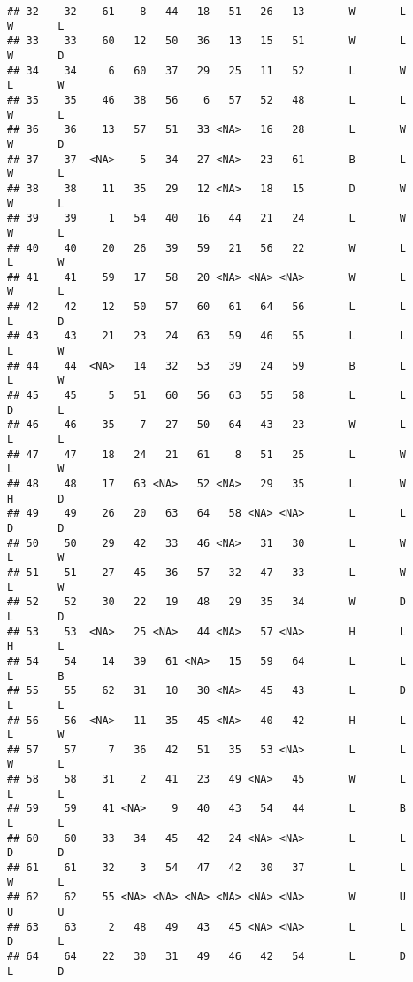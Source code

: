 \documentclass[
]{article}
\begin{document}
\begin{verbatim}
## 32    32    61    8   44   18   51   26   13       W       L       W       L
## 33    33    60   12   50   36   13   15   51       W       L       W       D
## 34    34     6   60   37   29   25   11   52       L       W       L       W
## 35    35    46   38   56    6   57   52   48       L       L       W       L
## 36    36    13   57   51   33 <NA>   16   28       L       W       W       D
## 37    37  <NA>    5   34   27 <NA>   23   61       B       L       W       L
## 38    38    11   35   29   12 <NA>   18   15       D       W       W       L
## 39    39     1   54   40   16   44   21   24       L       W       W       L
## 40    40    20   26   39   59   21   56   22       W       L       L       W
## 41    41    59   17   58   20 <NA> <NA> <NA>       W       L       W       L
## 42    42    12   50   57   60   61   64   56       L       L       L       D
## 43    43    21   23   24   63   59   46   55       L       L       L       W
## 44    44  <NA>   14   32   53   39   24   59       B       L       L       W
## 45    45     5   51   60   56   63   55   58       L       L       D       L
## 46    46    35    7   27   50   64   43   23       W       L       L       L
## 47    47    18   24   21   61    8   51   25       L       W       L       W
## 48    48    17   63 <NA>   52 <NA>   29   35       L       W       H       D
## 49    49    26   20   63   64   58 <NA> <NA>       L       L       D       D
## 50    50    29   42   33   46 <NA>   31   30       L       W       L       W
## 51    51    27   45   36   57   32   47   33       L       W       L       W
## 52    52    30   22   19   48   29   35   34       W       D       L       D
## 53    53  <NA>   25 <NA>   44 <NA>   57 <NA>       H       L       H       L
## 54    54    14   39   61 <NA>   15   59   64       L       L       L       B
## 55    55    62   31   10   30 <NA>   45   43       L       D       L       L
## 56    56  <NA>   11   35   45 <NA>   40   42       H       L       L       W
## 57    57     7   36   42   51   35   53 <NA>       L       L       W       L
## 58    58    31    2   41   23   49 <NA>   45       W       L       L       L
## 59    59    41 <NA>    9   40   43   54   44       L       B       L       L
## 60    60    33   34   45   42   24 <NA> <NA>       L       L       D       D
## 61    61    32    3   54   47   42   30   37       L       L       W       L
## 62    62    55 <NA> <NA> <NA> <NA> <NA> <NA>       W       U       U       U
## 63    63     2   48   49   43   45 <NA> <NA>       L       L       D       L
## 64    64    22   30   31   49   46   42   54       L       D       L       D

\end{verbatim}
\end{document}
